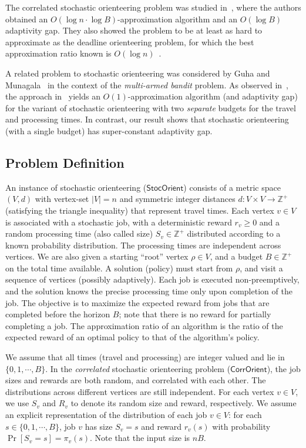 \documentclass[11pt,letterpaper]{article}
\numberwithin{algorithm}{section}
\newcommand{\Z}[0]{{\ensuremath{\mathbb{Z}}}}
\newcommand{\so}{\ensuremath{\mathsf{StocOrient}}\xspace}
\newcommand{\co}{\ensuremath{\mathsf{CorrOrient}}\xspace}
\newcommand{\size}{{S}}
\begin{document}
The correlated stochastic orienteering problem was studied in~\cite{GKNR12}, where the authors obtained an $O(\log n\cdot \log B)$-approximation algorithm and an $O(\log B)$ adaptivity gap. They also showed the  problem to be at least as hard to approximate as the deadline orienteering problem, for which the best approximation ratio known is $O(\log n)$~\cite{BBCM04}.


A related problem to stochastic orienteering was considered by Guha and Munagala~\cite{GuhaM09} in the context of the {\em multi-armed bandit} problem. As observed in~\cite{GKNR12}, the approach in~\cite{GuhaM09} yields an $O(1)$-approximation algorithm (and adaptivity gap) for the variant of stochastic orienteering with two {\em separate} budgets for the travel and processing times. In contrast, our result shows that stochastic orienteering (with a single budget) has super-constant adaptivity gap.

\subsection{Problem Definition}\label{subsec:defn}
An instance of stochastic orienteering (\so) consists of a metric space
$(V, d)$ with vertex-set $|V| = n$ and symmetric integer distances $d: V \times V \rightarrow \Z^+$ (satisfying the
triangle inequality) that represent travel times.  Each vertex $v \in V$ is associated with a stochastic job, with a deterministic
reward $r_v\ge 0$ and a random processing time (also called size) $\size_v \in \Z^+$ distributed according to a
known probability distribution. The processing times are independent across vertices. We are also given a starting ``root'' vertex $\rho\in V$, and
a budget $B\in \Z^+$ on the total time available. A solution (policy) must start from $\rho$, and visit a sequence of vertices (possibly adaptively). Each job is executed non-preemptively, and the solution knows the precise processing time only upon completion of the job. The objective is to maximize the expected reward from jobs that are completed before the horizon $B$; note that there is no reward for partially completing a job.
The approximation ratio of an
algorithm is the ratio of the expected reward of an optimal policy to that of the algorithm's policy.


We assume that all times (travel and processing) are integer valued and lie in $\{0,1,\cdots,B\}$.
In the {\em correlated} stochastic orienteering problem (\co), the job sizes and rewards are both random, and correlated with each other.
The distributions across different vertices are still independent.  For each vertex $v\in V$, we use $S_v$ and $R_v$ to denote its random size and reward, respectively. We assume an explicit representation of the distribution of each job $v\in V$: for each $s\in\{0,1,\cdots,B\}$, job $v$ has size $S_v=s$ and reward $r_v(s)$ with probability $\Pr[S_v=s]=\pi_v(s)$. Note that the input size is $nB$.
\end{document}

